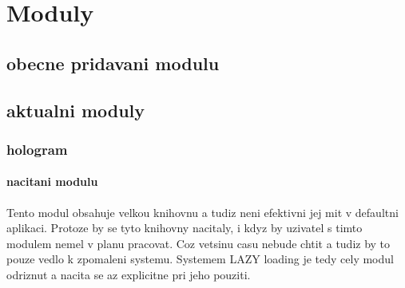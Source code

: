 \chapter{Moduly}

\section{obecne pridavani modulu}

\section{aktualni moduly}

\subsection{hologram}


\subsubsection{nacitani modulu}
Tento modul obsahuje velkou knihovnu a tudiz neni efektivni jej mit v defaultni aplikaci.
Protoze by se tyto knihovny nacitaly, i kdyz by uzivatel s timto modulem nemel v planu pracovat.
Coz vetsinu casu nebude chtit a tudiz by to pouze vedlo k zpomaleni systemu.
Systemem LAZY loading je tedy cely modul odriznut a nacita se az explicitne pri jeho pouziti.

